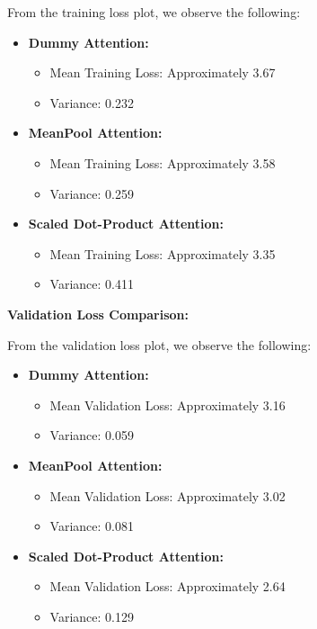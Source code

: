 \documentclass{article}
\begin{document}
From the training loss plot, we observe the following:
\begin{itemize}
    \item \textbf{Dummy Attention:}
    \begin{itemize}
        \item Mean Training Loss: Approximately 3.67
        \item Variance: 0.232
    \end{itemize}
    \item \textbf{MeanPool Attention:}
    \begin{itemize}
        \item Mean Training Loss: Approximately 3.58
        \item Variance: 0.259
    \end{itemize}
    \item \textbf{Scaled Dot-Product Attention:}
    \begin{itemize}
        \item Mean Training Loss: Approximately 3.35
        \item Variance: 0.411
    \end{itemize}
\end{itemize}

\textbf{Validation Loss Comparison:}

From the validation loss plot, we observe the following:
\begin{itemize}
    \item \textbf{Dummy Attention:}
    \begin{itemize}
        \item Mean Validation Loss: Approximately 3.16
        \item Variance: 0.059
    \end{itemize}
    \item \textbf{MeanPool Attention:}
    \begin{itemize}
        \item Mean Validation Loss: Approximately 3.02
        \item Variance: 0.081
    \end{itemize}
    \item \textbf{Scaled Dot-Product Attention:}
    \begin{itemize}
        \item Mean Validation Loss: Approximately 2.64
        \item Variance: 0.129
    \end{itemize}
\end{itemize}
\end{document}

